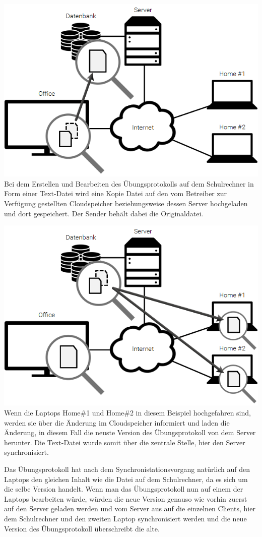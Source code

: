 \includegraphics[]{images/Dropbox_1}
Bei dem Erstellen und Bearbeiten des Übungsprotokolls auf dem Schulrechner in Form
einer Text-Datei wird eine Kopie Datei auf den vom Betreiber zur Verfügung gestellten
Cloudspeicher beziehungsweise dessen Server hochgeladen und dort gespeichert.
Der Sender behält dabei die Originaldatei.

\includegraphics[]{images/Dropbox_2}
Wenn die Laptops Home\#1 und Home\#2 in diesem Beispiel hochgefahren sind, werden
sie über die Änderung im Cloudspeicher informiert und laden die Änderung, in
diesem Fall die neuste Version des Übungsprotokoll von dem Server herunter.
Die Text-Datei wurde somit über die zentrale Stelle, hier den Server synchronisiert.

Das Übungsprotokoll hat nach dem Synchronistationsvorgang natürlich auf den Laptops
den gleichen Inhalt wie die Datei auf dem Schulrechner, da es sich um die selbe Version
handelt. Wenn man das Übungsprotokoll nun auf einem der Laptops bearbeiten würde, würden
die neue Version genauso wie vorhin zuerst auf den Server geladen werden und vom Server
aus auf die einzelnen Clients, hier dem Schulrechner und den zweiten Laptop synchronisiert
werden und die neue Version des Übungsprotokoll überschreibt die alte.
